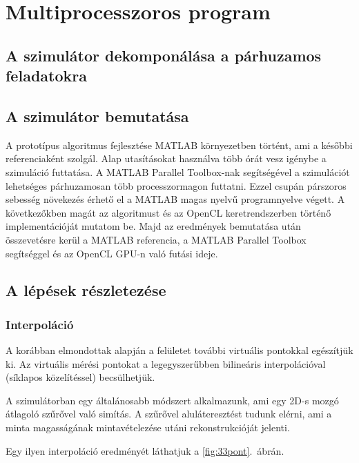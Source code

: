\chapter{Multiprocesszoros program}
\section{A szimulátor dekomponálása a párhuzamos feladatokra}

\section{A szimulátor bemutatása}
	 A prototípus algoritmus fejlesztése MATLAB környezetben történt, ami a későbbi referenciaként szolgál.
	 Alap utasításokat használva több órát vesz igénybe a szimuláció futtatása.
	 A MATLAB Parallel Toolbox-nak segítségével a szimulációt lehetséges párhuzamosan több processzormagon futtatni.
	 Ezzel csupán párszoros sebesség növekezés érhető el a MATLAB magas nyelvű programnyelve végett.
	 A következőkben magát az algoritmust és az OpenCL keretrendszerben történő implementációját mutatom be.
	 Majd az eredmények bemutatása után összevetésre kerül a MATLAB referencia, a MATLAB Parallel Toolbox segítséggel és az OpenCL
	 GPU-n való futási ideje.
	
\section{A lépések részletezése} 
\subsection{Interpoláció}
	A korábban elmondottak alapján a felületet további virtuális pontokkal egészítjük ki.
	Az virtuális mérési pontokat a legegyszerűbben bilineáris interpolációval (síklapos közelítéssel) becsülhetjük.
	\begin{changebar}
	A szimulátorban egy általánosabb módszert alkalmazunk, ami egy 2D-s mozgó átlagoló szűrővel való simítás.
	A szűrővel aluláteresztést tudunk elérni, ami a minta magasságának mintavételezése utáni rekonstrukcióját jelenti.
	\end{changebar}
	Egy ilyen interpoláció eredményét láthatjuk a \ref{fig:33pont}.~ábrán.
	
